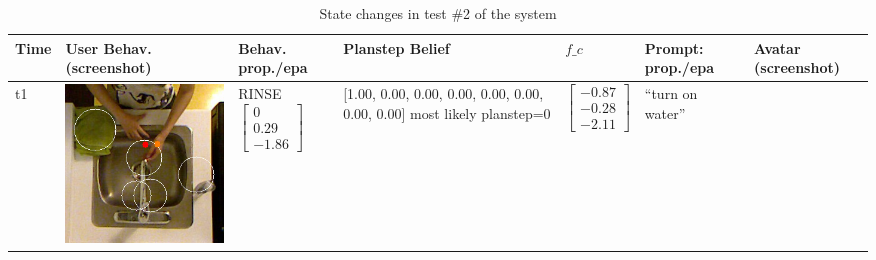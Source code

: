 %

\begin{longtable}{| V{0.8cm} | V{2.6cm} | V{1.6cm} | V{2.1cm} | V{1.55cm} | V{1.6cm} | V{3.2cm} |}
\caption{State changes in test \#2 of the system}
\label{table:result-2}
\\ \hline


Time &
User Behav. (screenshot) &
Behav. prop./epa &
Planstep Belief &
$f\_c$ &
Prompt: prop./epa &
Avatar (screenshot) \\ \hline
\endfirsthead

t1 &
\includegraphics[width=\linewidth]{fig/system/_slow2-rinse1_.jpg} &
RINSE
\linebreak\linebreak
$\begin{bmatrix}
0 \\
0.29 \\
-1.86
\end{bmatrix}$ &
[1.00, 0.00, 0.00, 0.00, 0.00, 0.00, 0.00, 0.00] most likely planstep=0 &
$\begin{bmatrix}
-0.87 \\
-0.28 \\
-2.11
\end{bmatrix}$ &
``turn on water''
\linebreak\linebreak

\end{longtable}
